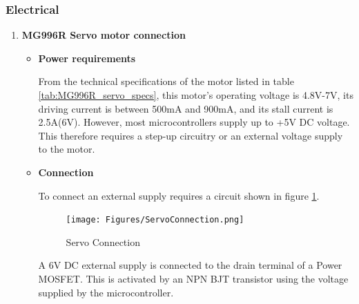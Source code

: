 \subsubsection{Electrical}
\begin{enumerate}
    \item \textbf{MG996R Servo motor connection}
    \par
    \begin{itemize}
        \item \textbf{Power requirements}
        \par
        From the technical specifications of the motor listed in table \ref{tab:MG996R_servo_specs}, this motor's operating voltage is 4.8V-7V, its driving current is between 500mA and 900mA, and its stall current is 2.5A(6V). However, most microcontrollers supply up to +5V DC voltage. This therefore requires a step-up circuitry or an external voltage supply to the  motor.
        \item \textbf{Connection}
        \par
        To connect an external supply requires a circuit shown in figure \ref{fig:servo_connection}.
        \begin{figure}[H]
            \centering
            \texttt{[image: Figures/ServoConnection.png]}
            \caption{Servo Connection}
            \label{fig:servo_connection}
        \end{figure}
        A 6V DC external supply is connected to the drain terminal of a Power MOSFET. This is activated by an NPN BJT transistor using the voltage supplied by the microcontroller.
    \end{itemize}
    

\end{enumerate}
